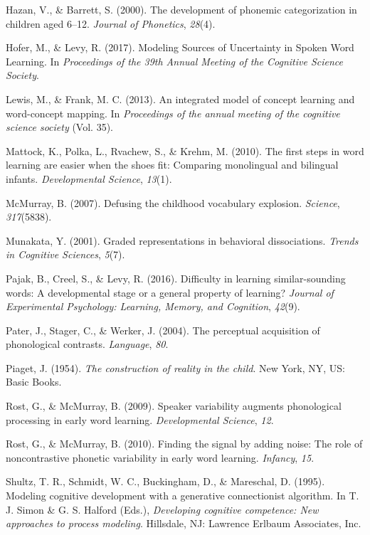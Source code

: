 \documentclass[english,,man,floatsintext]{apa6}
\theoremstyle{definition}
\theoremstyle{definition}
\theoremstyle{definition}
\theoremstyle{remark}
\begin{document}
\hypertarget{ref-hazan2000}{}
Hazan, V., \& Barrett, S. (2000). The development of phonemic
categorization in children aged 6--12. \emph{Journal of Phonetics},
\emph{28}(4).

\hypertarget{ref-hofer2017}{}
Hofer, M., \& Levy, R. (2017). Modeling Sources of Uncertainty in Spoken
Word Learning. In \emph{Proceedings of the 39th Annual Meeting of the
Cognitive Science Society}.

\hypertarget{ref-lewis2013}{}
Lewis, M., \& Frank, M. C. (2013). An integrated model of concept
learning and word-concept mapping. In \emph{Proceedings of the annual
meeting of the cognitive science society} (Vol. 35).

\hypertarget{ref-Mattock2010}{}
Mattock, K., Polka, L., Rvachew, S., \& Krehm, M. (2010). The first
steps in word learning are easier when the shoes fit: Comparing
monolingual and bilingual infants. \emph{Developmental Science},
\emph{13}(1).

\hypertarget{ref-McMurray2007}{}
McMurray, B. (2007). Defusing the childhood vocabulary explosion.
\emph{Science}, \emph{317}(5838).

\hypertarget{ref-Munakata2001}{}
Munakata, Y. (2001). Graded representations in behavioral dissociations.
\emph{Trends in Cognitive Sciences}, \emph{5}(7).

\hypertarget{ref-pajak2016}{}
Pajak, B., Creel, S., \& Levy, R. (2016). Difficulty in learning
similar-sounding words: A developmental stage or a general property of
learning? \emph{Journal of Experimental Psychology: Learning, Memory,
and Cognition}, \emph{42}(9).

\hypertarget{ref-pater2004}{}
Pater, J., Stager, C., \& Werker, J. (2004). The perceptual acquisition
of phonological contrasts. \emph{Language}, \emph{80}.

\hypertarget{ref-piaget1954}{}
Piaget, J. (1954). \emph{The construction of reality in the child}. New
York, NY, US: Basic Books.

\hypertarget{ref-rost2009}{}
Rost, G., \& McMurray, B. (2009). Speaker variability augments
phonological processing in early word learning. \emph{Developmental
Science}, \emph{12}.

\hypertarget{ref-rost2010}{}
Rost, G., \& McMurray, B. (2010). Finding the signal by adding noise:
The role of noncontrastive phonetic variability in early word learning.
\emph{Infancy}, \emph{15}.

\hypertarget{ref-shultz1995}{}
Shultz, T. R., Schmidt, W. C., Buckingham, D., \& Mareschal, D. (1995).
Modeling cognitive development with a generative connectionist
algorithm. In T. J. Simon \& G. S. Halford (Eds.), \emph{Developing
cognitive competence: New approaches to process modeling}. Hillsdale,
NJ: Lawrence Erlbaum Associates, Inc.
\end{document}
